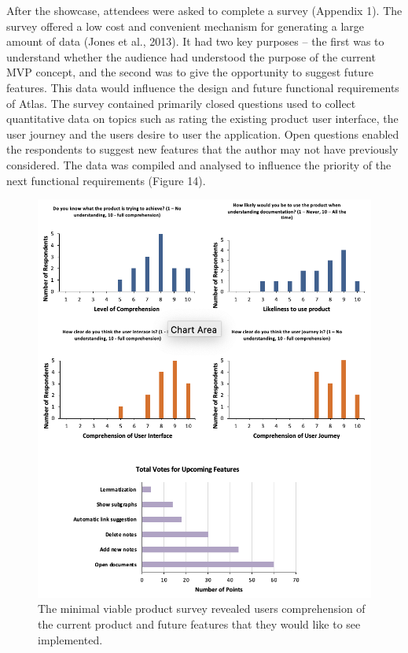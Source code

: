 \documentclass{article}
\begin{document}
After the showcase, attendees were asked to complete a survey (Appendix 1). The survey offered a low cost and convenient mechanism for generating a large amount of data (Jones et al., 2013). It had two key purposes – the first was to understand whether the audience had understood the purpose of the current MVP concept, and the second was to give the opportunity to suggest future features. This data would influence the design and future functional requirements of Atlas. The survey contained primarily closed questions used to collect quantitative data on topics such as rating the existing product user interface, the user journey and the users desire to user the application. Open questions enabled the respondents to suggest new features that the author may not have previously considered. The data was compiled and analysed to influence the priority of the next functional requirements (Figure 14).

\begin{figure}[!htb]
  \centering
      \includegraphics[width=1\textwidth]{images/survey-results.png}
  \caption{The minimal viable product survey revealed users comprehension of the current product and future features that they would like to see implemented.}
\end{figure}
\end{document}
